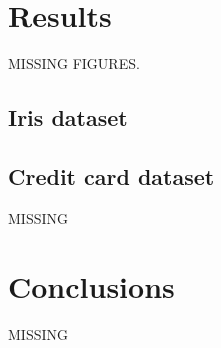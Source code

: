 \documentclass[conference]{IEEEtran}
\begin{document}
\section{Results}
MISSING FIGURES. 
\subsection{Iris dataset}

\subsection{Credit card dataset}
MISSING

\section{Conclusions}
MISSING
\nocite{*}


\end{document}
